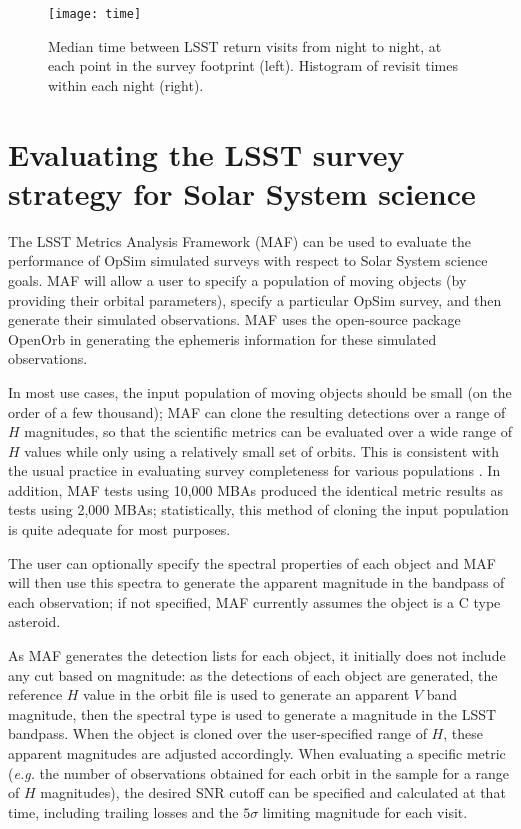 \documentclass{iau}
\begin{document}
\begin{figure}
\centering
\texttt{[image: time]}
\caption{Median time between LSST return visits from night to night,
  at each point in the survey footprint (left). Histogram of revisit times
  within each night (right). 
\label{time}}
\end{figure}


\section{Evaluating the LSST survey strategy for Solar System science}

The LSST Metrics Analysis Framework (MAF) can be used to evaluate the
performance of OpSim simulated surveys with respect to Solar System
science goals. MAF will allow a user to specify a population of moving
objects (by providing their orbital parameters), specify a particular
OpSim survey, and then generate their simulated observations. MAF uses
the open-source package OpenOrb \cite{oorb} in generating the
ephemeris information for these simulated observations.

In most use cases, the input population of moving objects should be
small (on the order of a few thousand); MAF can clone the resulting
detections over a range of $H$ magnitudes, so that the scientific
metrics can be evaluated over a wide range of $H$ values while only
using a relatively small set of orbits. This is consistent with the
usual practice in evaluating survey completeness for various
populations \cite{harris}. In addition, MAF tests using 10,000 MBAs
produced the identical metric results as tests using 2,000 MBAs;
statistically, this method of cloning the input population is quite
adequate for most purposes.

The user can optionally specify the spectral properties of each object
and MAF will then use this spectra to generate the apparent magnitude
in the bandpass of each observation; if not specified, MAF currently
assumes the object is a C type asteroid.

As MAF generates the detection lists for each object, it initially
does not include any cut based on magnitude: as the detections of each
object are generated, the reference $H$ value in the orbit file is
used to generate an apparent $V$ band magnitude, then the spectral
type is used to generate a magnitude in the LSST bandpass. When the
object is cloned over the user-specified range of $H$, these apparent
magnitudes are adjusted accordingly. When evaluating
a specific metric ({\it e.g.} the number of observations obtained for
each orbit in the sample for a range of $H$ magnitudes), the desired
SNR cutoff can be specified and calculated at that time, including trailing
losses and the $5\sigma$ limiting magnitude for each visit.
\end{document}
